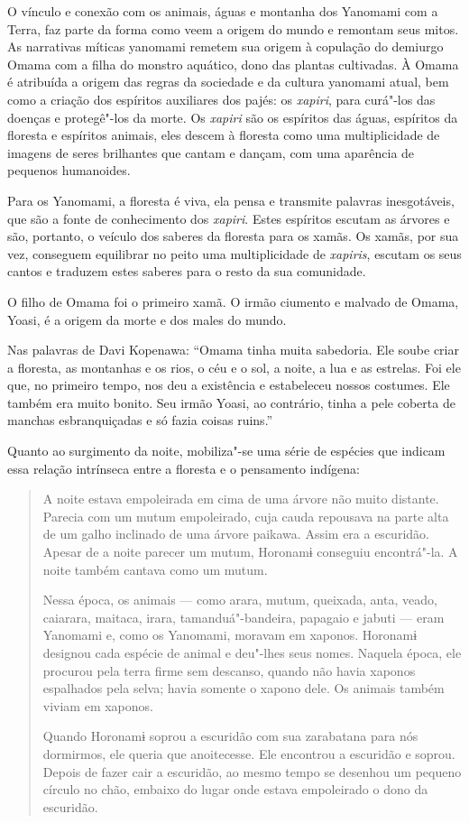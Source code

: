 \documentclass[12pt]{extarticle}
\begin{document}
O vínculo e conexão com os animais, águas e montanha dos Yanomami com a 
Terra, faz parte da forma como veem a origem do mundo e remontam seus mitos. 
As narrativas míticas yanomami remetem sua origem à copulação do demiurgo 
Omama com a filha do monstro aquático, dono das plantas cultivadas. À Omama
é atribuída a origem das regras da sociedade e da cultura yanomami atual,
bem como a criação dos espíritos auxiliares dos pajés: os \emph{xapiri}, 
para curá"-los das doenças e protegê"-los da morte. Os \emph{xapiri} são os 
espíritos das águas, espíritos da floresta e espíritos animais, eles descem 
à floresta como uma multiplicidade de imagens de seres brilhantes que cantam 
e dançam, com uma aparência de pequenos humanoides.

Para os Yanomami, a floresta é viva, ela pensa e transmite palavras inesgotáveis,
que são a fonte de conhecimento dos \emph{xapiri}. Estes espíritos escutam as 
árvores e são, portanto, o veículo dos saberes da floresta para os xamãs. Os xamãs,
por sua vez, conseguem equilibrar no peito uma multiplicidade de \emph{xapiris}, 
escutam os seus cantos e traduzem estes saberes para o resto da sua comunidade.

O filho de Omama foi o primeiro xamã. O irmão ciumento e malvado de Omama,
Yoasi, é a origem da morte e dos males do mundo.

Nas palavras de Davi Kopenawa: ``Omama  tinha muita sabedoria. Ele soube criar a 
floresta, as montanhas e os rios, o céu e o sol, a noite, a lua e as estrelas. 
Foi ele que, no primeiro tempo, nos deu a existência e estabeleceu nossos costumes. 
Ele também era muito bonito. Seu irmão Yoasi, ao contrário, tinha a pele coberta de 
manchas esbranquiçadas e só fazia coisas ruins.''

Quanto ao surgimento da noite, mobiliza"-se uma série de espécies que indicam essa 
relação intrínseca entre a floresta e o pensamento indígena: 

\begin{quote}
A noite estava empoleirada em cima de uma árvore não muito distante. Parecia com 
um mutum empoleirado, cuja cauda repousava na parte alta de um galho inclinado de 
uma árvore paikawa. Assim era a escuridão. Apesar de a noite parecer um mutum, 
Horonamɨ conseguiu encontrá"-la. A noite também cantava como um mutum.

Nessa época, os animais — como arara, mutum, queixada, anta, veado, caiarara, maitaca, 
irara, tamanduá"-bandeira, papagaio e jabuti — eram Yanomami e, como os Yanomami, moravam 
em xaponos. Horonamɨ designou cada espécie de animal e deu"-lhes seus nomes. Naquela época, 
ele procurou pela terra firme sem descanso, quando não havia xaponos espalhados pela selva; 
havia somente o xapono dele. Os animais também viviam em xaponos.

Quando Horonamɨ soprou a escuridão com sua zarabatana para nós dormirmos, ele queria que 
anoitecesse. Ele encontrou a escuridão e soprou. Depois de fazer cair a escuridão, ao mesmo 
tempo se desenhou um pequeno círculo no chão, embaixo do lugar onde estava empoleirado o 
dono da escuridão.
\end{quote}
\end{document}
